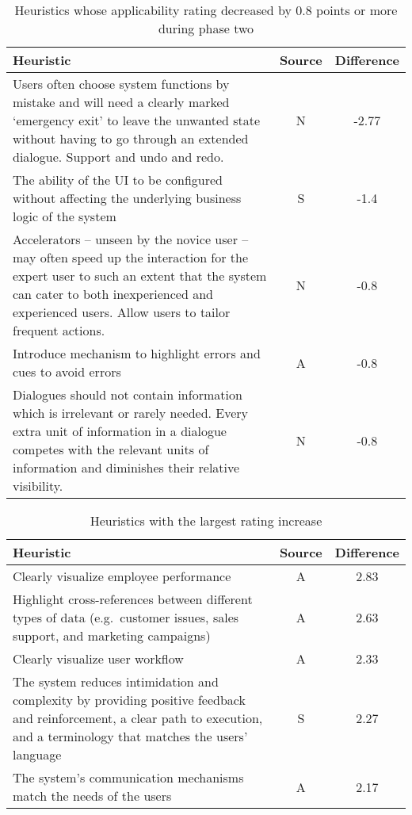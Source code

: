 \begin{table}[htbp]
	\centering
	\vspace{0.5cm}
	\caption{Heuristics whose applicability rating decreased by 0.8 points or more during phase two}
	\label{tab:biggest_losers}
	\begin{tabularx}{\textwidth}{Xcc}	\toprule
		\textbf{Heuristic} & \textbf{Source} & \textbf{Difference} \\ \midrule
		Users often choose system functions by mistake and will need a clearly marked `emergency exit' to leave the unwanted state without having to go through an extended dialogue. Support and undo and redo. & N & -2.77 \\
		The ability of the UI to be configured without affecting the underlying business logic of the system & S & -1.4 \\
		Accelerators -- unseen by the novice user -- may often speed up the interaction for the expert user to such an extent that the system can cater to both inexperienced and experienced users. Allow users to tailor frequent actions. & N & -0.8 \\
		Introduce mechanism to highlight errors and cues to avoid errors & A & -0.8 \\
		Dialogues should not contain information which is irrelevant or rarely needed. Every extra unit of information in a dialogue competes with the relevant units of information and diminishes their relative visibility. & N & -0.8 \\
		\bottomrule
	\end{tabularx}
\end{table}

\begin{table}[htbp]
	\centering
	\vspace{0.5cm}
	\caption{Heuristics with the largest rating increase}
	\label{tab:biggest_winners_overall}
	\begin{tabularx}{\textwidth}{Xcc}	\toprule
		\textbf{Heuristic} & \textbf{Source} & \textbf{Difference} \\ \midrule
			Clearly visualize employee performance & A & 2.83 \\
			Highlight cross-references between different types of data (e.g.\ customer issues, sales support, and marketing campaigns) & A & 2.63 \\
			Clearly visualize user workflow & A & 2.33 \\
			The system reduces intimidation and complexity by providing positive feedback and reinforcement, a clear path to execution, and a terminology that matches the users' language & S & 2.27 \\
			The system's communication mechanisms match the needs of the users & A & 2.17 \\
		\bottomrule
	\end{tabularx}
\end{table}

